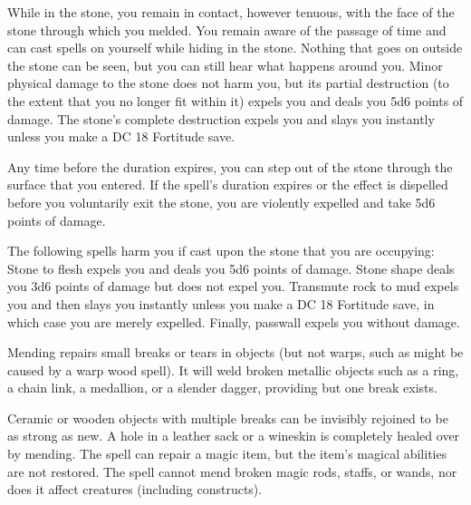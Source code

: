 \begin{multicols}{2}
\begin{small}
\smallskip\noindent While in the stone, you remain in contact, however tenuous, with the face of the stone through which you melded. You remain aware of the passage of time and can cast spells on yourself while hiding in the stone. Nothing that goes on outside the stone can be seen, but you can still hear what happens around you. Minor physical damage to the stone does not harm you, but its partial destruction (to the extent that you no longer fit within it) expels you and deals you 5d6 points of damage. The stone's complete destruction expels you and slays you instantly unless you make a DC 18 Fortitude save.

\smallskip\noindent Any time before the duration expires, you can step out of the stone through the surface that you entered. If the spell's duration expires or the effect is dispelled before you voluntarily exit the stone, you are violently expelled and take 5d6 points of damage.

\smallskip\noindent The following spells harm you if cast upon the stone that you are occupying: Stone to flesh expels you and deals you 5d6 points of damage. Stone shape deals you 3d6 points of damage but does not expel you. Transmute rock to mud expels you and then slays you instantly unless you make a DC 18 Fortitude save, in which case you are merely expelled. Finally, passwall expels you without damage.

\noindent Mending repairs small breaks or tears in objects (but not warps, such as might be caused by a warp wood spell). It will weld broken metallic objects such as a ring, a chain link, a medallion, or a slender dagger, providing but one break exists.

\smallskip\noindent Ceramic or wooden objects with multiple breaks can be invisibly rejoined to be as strong as new. A hole in a leather sack or a wineskin is completely healed over by mending. The spell can repair a magic item, but the item's magical abilities are not restored. The spell cannot mend broken magic rods, staffs, or wands, nor does it affect creatures (including constructs).


\end{small}
\end{multicols}
